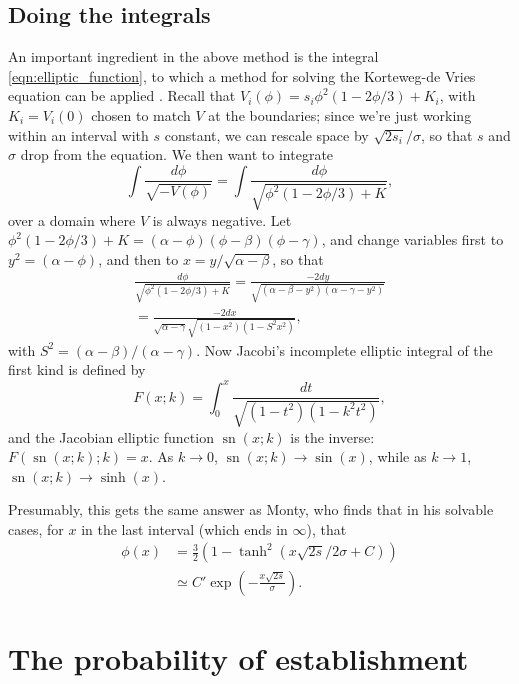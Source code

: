 \documentclass{article}
\DeclareMathOperator{\sn}{sn}
\begin{document}
\subsection{Doing the integrals}

An important ingredient in the above method is the integral \eqref{eqn:elliptic_function},
to which a method for solving the Korteweg-de Vries equation can be applied \citep{NEQwiki}.
Recall that $V_i(\phi) =  s_i \phi^2(1-2\phi/3) + K_i$, with $K_i = V_i(0)$ chosen to match $V$ at the boundaries;
since we're just working within an interval with $s$ constant, we can rescale space by $\sqrt{2 s_i}/\sigma$,
so that $s$ and $\sigma$ drop from the equation.
We then want to integrate
\[
    \int \frac{ d\phi }{ \sqrt{-V(\phi)} } = 
         \int \frac{ d\phi }{ \sqrt{ \phi^2 (1-2\phi/3) + K } } ,
\]
over a domain where $V$ is always negative.
Let $\phi^2(1-2\phi/3)+K = (\alpha-\phi)(\phi-\beta)(\phi-\gamma)$,
and change variables first to $y^2=(\alpha-\phi)$, 
and then to $x = y/\sqrt{\alpha-\beta}$, so that
\begin{align*}
    \frac{ d\phi }{ \sqrt{ \phi^2 (1-2\phi/3) + K } } 
        = \frac{ - 2 dy }{ \sqrt{ (\alpha-\beta-y^2) (\alpha-\gamma-y^2) } } \\
        = \frac{ - 2 dx }{ \sqrt{\alpha-\gamma} \sqrt{ (1-x^2) (1-S^2 x^2) } } ,
\end{align*}
with $S^2 = (\alpha-\beta)/(\alpha-\gamma)$.
Now Jacobi's incomplete elliptic integral of the first kind is defined by
\[
    F(x;k) = \int_0^x \frac{dt}{\sqrt{ (1-t^2)(1-k^2t^2) }} ,
\]
and the Jacobian elliptic function $\sn(x;k)$ is the inverse: $F(\sn(x;k);k) = x$.
As $k \to 0$, $\sn(x;k) \to \sin(x)$, while as $k \to 1$, $\sn(x;k) \to \sinh(x)$.

Presumably, this gets the same answer as Monty, who finds that in his solvable cases,
for $x$ in the last interval (which ends in $\infty$), that
\begin{align*}
    \phi(x) &= \frac{3}{2}\left( 1 - \tanh^2 ( x \sqrt{2s} / 2 \sigma + C ) \right) \\
        &\simeq C' \exp\left( - \frac{ x \sqrt{2s} }{ \sigma } \right) .
\end{align*}


\section{The probability of establishment}
\label{ss:prob_estab}
\end{document}
